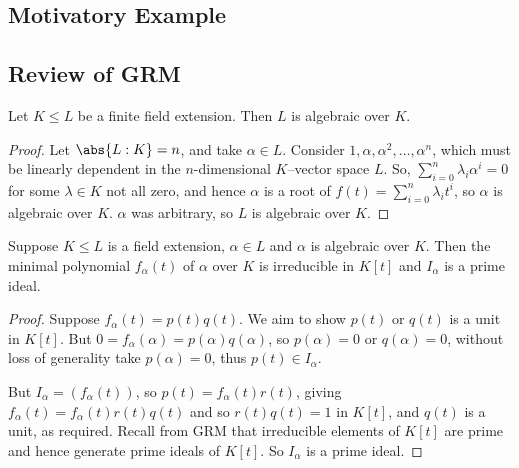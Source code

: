 \documentclass{article}
\begin{document}
\subsection{Motivatory Example}\label{sec:motivEg}


































\subsection{Review of GRM}



\begin{nlemma}\label{lem:1.5}
    Let $K \leq L$ be a finite field extension. Then $L$ is algebraic over $K$.
\end{nlemma}
\begin{proof}
    Let $\abs{L:K}=n$, and take $\alpha \in L$. Consider $1, \alpha, \alpha^2, \dotsc, \alpha^n$, which must be linearly dependent in the $n$-dimensional $K$--vector space $L$.
    So, $\sum_{i=0}^n \lambda_i \alpha^i = 0$ for some $\lambda \in K$ not all zero, and hence $\alpha$ is a root of $f(t) = \sum_{i=0}^n \lambda_i t^i$, so $\alpha$ is algebraic over $K$.
    $\alpha$ was arbitrary, so $L$ is algebraic over $K$.
\end{proof}



\begin{nlemma}\label{lem:1.7}
    Suppose $K \leq L$ is a field extension, $\alpha \in L$ and $\alpha$ is algebraic over $K$.
    Then the minimal polynomial $f_\alpha(t)$ of $\alpha$ over $K$ is irreducible in $K[t]$ and $I_\alpha$ is a prime ideal.
\end{nlemma}
\begin{proof}
    Suppose $f_\alpha(t) = p(t) q(t)$. We aim to show $p(t)$ or $q(t)$ is a unit in $K[t]$.
    But $0 = f_\alpha(\alpha) = p(\alpha) q(\alpha)$, so $p(\alpha) = 0$ or $q(\alpha) = 0$, without loss of generality take $p(\alpha) = 0$, thus $p(t) \in I_\alpha$.

    But $I_\alpha=(f_\alpha(t))$, so $p(t) = f_\alpha(t) r(t)$, giving $f_\alpha(t) = f_\alpha(t) r(t) q(t)$ and so $r(t) q(t) = 1$ in $K[t]$, and $q(t)$ is a unit, as required.
    Recall from GRM that irreducible elements of $K[t]$ are prime and hence generate prime ideals of $K[t]$. So $I_\alpha$ is a prime ideal.
\end{proof}
\end{document}

